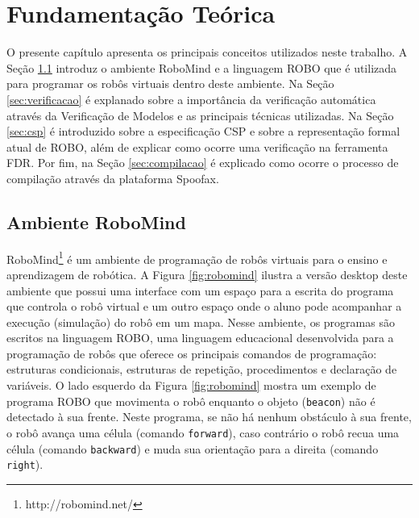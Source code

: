 \chapter{Fundamentação Teórica}
\label{chap:cap2}

O presente capítulo apresenta os principais conceitos utilizados neste trabalho. A Seção \ref{sec:ambiente} introduz o ambiente RoboMind e a linguagem ROBO que é utilizada para programar os robôs virtuais dentro deste ambiente. Na Seção \ref{sec:verificacao} é explanado sobre a importância da verificação automática através da Verificação de Modelos e as principais técnicas utilizadas. Na Seção \ref{sec:csp} é introduzido sobre a especificação CSP e sobre a representação formal atual de ROBO, além de explicar como ocorre uma verificação na ferramenta FDR. Por fim, na Seção \ref{sec:compilacao} é explicado como ocorre o processo de compilação através da plataforma Spoofax.

\section{Ambiente RoboMind}
\label{sec:ambiente}


RoboMind\footnote[2]{http://robomind.net/} é um ambiente de programação de robôs virtuais para o ensino e aprendizagem de robótica. A Figura \ref{fig:robomind} ilustra a versão desktop deste ambiente que possui uma interface com um espaço para a escrita do programa que controla o robô virtual e um outro espaço onde o aluno pode acompanhar a execução (simulação) do robô em um mapa. Nesse ambiente, os programas são escritos na linguagem ROBO, uma linguagem educacional desenvolvida para a programação de robôs que oferece os principais comandos de programação: estruturas condicionais, estruturas de repetição, procedimentos e declaração de variáveis. O lado esquerdo da Figura \ref{fig:robomind} mostra um exemplo de programa ROBO que movimenta o robô enquanto o objeto (\texttt{beacon}) não é detectado à sua frente. Neste programa, se não há nenhum obstáculo à sua frente, o robô avança uma célula (comando \texttt{forward}), caso contrário o robô recua uma célula (comando \texttt{backward}) e muda sua orientação para a direita (comando \texttt{right}).

